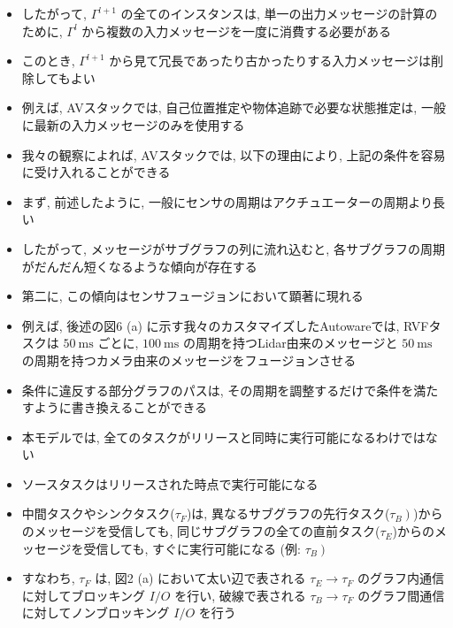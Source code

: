 \begin{frame}{}
    \begin{itemize}
        \item したがって, $\Gamma^{l+1}$ の全てのインスタンスは, 単一の出力メッセージの計算のために, $\Gamma^{l}$ から複数の入力メッセージを一度に消費する必要がある
        \item このとき, $\Gamma^{l+1}$ から見て冗長であったり古かったりする入力メッセージは削除してもよい
        \item 例えば, AVスタックでは, 自己位置推定や物体追跡で必要な状態推定は, 一般に最新の入力メッセージのみを使用する
        \item 我々の観察によれば, AVスタックでは, 以下の理由により, 上記の条件を容易に受け入れることができる
        \item まず, 前述したように, 一般にセンサの周期はアクチュエーターの周期より長い
        \item したがって, メッセージがサブグラフの列に流れ込むと, 各サブグラフの周期がだんだん短くなるような傾向が存在する
    \end{itemize}
\end{frame}

\begin{frame}{}
    \begin{itemize}
        \item 第二に, この傾向はセンサフュージョンにおいて顕著に現れる
        \item 例えば, 後述の図6 (a) に示す我々のカスタマイズしたAutowareでは, RVFタスクは $50 \mathrm{~ms}$ ごとに, $100 \mathrm{~ms}$ の周期を持つLidar由来のメッセージと $50 \mathrm{~ms}$ の周期を持つカメラ由来のメッセージをフュージョンさせる
        \item 条件に違反する部分グラフのパスは, その周期を調整するだけで条件を満たすように書き換えることができる
        \item 本モデルでは, 全てのタスクがリリースと同時に実行可能になるわけではない
        \item ソースタスクはリリースされた時点で実行可能になる
    \end{itemize}
\end{frame}

\begin{frame}{}
    \begin{itemize}
        \item 中間タスクやシンクタスク($\tau_{F}$)は, 異なるサブグラフの先行タスク($\left.\tau_{B}\right)$)からのメッセージを受信しても, 同じサブグラフの全ての直前タスク($\tau_{E}$)からのメッセージを受信しても, すぐに実行可能になる (例: $\left.\tau_{B}\right)$
        \item すなわち, $\tau_{F}$ は, 図2 (a) において太い辺で表される $\tau_{E} \rightarrow \tau_{F}$ のグラフ内通信に対してブロッキング $I / O$ を行い, 破線で表される $\tau_{B} \rightarrow \tau_{F}$ のグラフ間通信に対してノンブロッキング $I / O$ を行う
    \end{itemize}
\end{frame}

